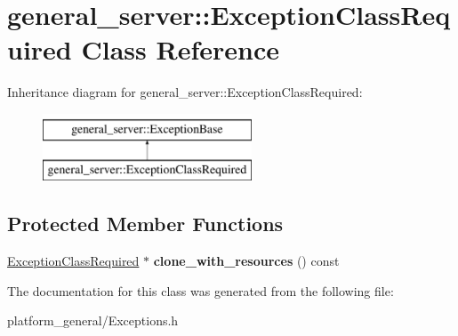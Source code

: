 \hypertarget{classgeneral__server_1_1ExceptionClassRequired}{\section{general\-\_\-server\-:\-:\-Exception\-Class\-Required \-Class \-Reference}
\label{classgeneral__server_1_1ExceptionClassRequired}
}
\-Inheritance diagram for general\-\_\-server\-:\-:\-Exception\-Class\-Required\-:\begin{figure}[H]
\begin{center}
\leavevmode
\includegraphics[height=2.000000cm]{classgeneral__server_1_1ExceptionClassRequired}
\end{center}
\end{figure}
\subsection*{\-Protected \-Member \-Functions}
\begin{DoxyCompactItemize}
\item 
\hypertarget{classgeneral__server_1_1ExceptionClassRequired_a77e1e37427cabb2be92ced420044d513}{\hyperlink{classgeneral__server_1_1ExceptionClassRequired}{\-Exception\-Class\-Required} $\ast$ {\bfseries clone\-\_\-with\-\_\-resources} () const }\label{classgeneral__server_1_1ExceptionClassRequired_a77e1e37427cabb2be92ced420044d513}

\end{DoxyCompactItemize}


\-The documentation for this class was generated from the following file\-:\begin{DoxyCompactItemize}
\item 
platform\-\_\-general/\-Exceptions.\-h\end{DoxyCompactItemize}
